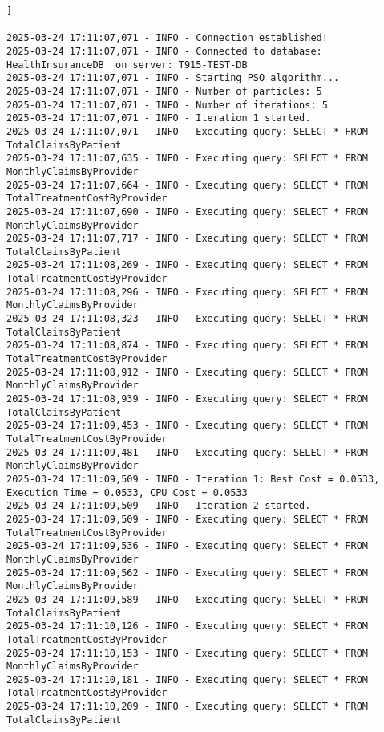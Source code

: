 

\begin{lstlisting}[style=pythonstyle, caption={Output from python code }, label={lst:pso_query_optimization}]]

2025-03-24 17:11:07,071 - INFO - Connection established!
2025-03-24 17:11:07,071 - INFO - Connected to database: HealthInsuranceDB  on server: T915-TEST-DB
2025-03-24 17:11:07,071 - INFO - Starting PSO algorithm...
2025-03-24 17:11:07,071 - INFO - Number of particles: 5
2025-03-24 17:11:07,071 - INFO - Number of iterations: 5
2025-03-24 17:11:07,071 - INFO - Iteration 1 started.
2025-03-24 17:11:07,071 - INFO - Executing query: SELECT * FROM TotalClaimsByPatient 
2025-03-24 17:11:07,635 - INFO - Executing query: SELECT * FROM MonthlyClaimsByProvider 
2025-03-24 17:11:07,664 - INFO - Executing query: SELECT * FROM TotalTreatmentCostByProvider 
2025-03-24 17:11:07,690 - INFO - Executing query: SELECT * FROM MonthlyClaimsByProvider 
2025-03-24 17:11:07,717 - INFO - Executing query: SELECT * FROM TotalClaimsByPatient 
2025-03-24 17:11:08,269 - INFO - Executing query: SELECT * FROM TotalTreatmentCostByProvider 
2025-03-24 17:11:08,296 - INFO - Executing query: SELECT * FROM MonthlyClaimsByProvider 
2025-03-24 17:11:08,323 - INFO - Executing query: SELECT * FROM TotalClaimsByPatient 
2025-03-24 17:11:08,874 - INFO - Executing query: SELECT * FROM TotalTreatmentCostByProvider 
2025-03-24 17:11:08,912 - INFO - Executing query: SELECT * FROM MonthlyClaimsByProvider 
2025-03-24 17:11:08,939 - INFO - Executing query: SELECT * FROM TotalClaimsByPatient 
2025-03-24 17:11:09,453 - INFO - Executing query: SELECT * FROM TotalTreatmentCostByProvider 
2025-03-24 17:11:09,481 - INFO - Executing query: SELECT * FROM MonthlyClaimsByProvider 
2025-03-24 17:11:09,509 - INFO - Iteration 1: Best Cost = 0.0533, Execution Time = 0.0533, CPU Cost = 0.0533
2025-03-24 17:11:09,509 - INFO - Iteration 2 started.
2025-03-24 17:11:09,509 - INFO - Executing query: SELECT * FROM TotalTreatmentCostByProvider 
2025-03-24 17:11:09,536 - INFO - Executing query: SELECT * FROM MonthlyClaimsByProvider 
2025-03-24 17:11:09,562 - INFO - Executing query: SELECT * FROM MonthlyClaimsByProvider 
2025-03-24 17:11:09,589 - INFO - Executing query: SELECT * FROM TotalClaimsByPatient 
2025-03-24 17:11:10,126 - INFO - Executing query: SELECT * FROM TotalTreatmentCostByProvider 
2025-03-24 17:11:10,153 - INFO - Executing query: SELECT * FROM MonthlyClaimsByProvider 
2025-03-24 17:11:10,181 - INFO - Executing query: SELECT * FROM TotalTreatmentCostByProvider 
2025-03-24 17:11:10,209 - INFO - Executing query: SELECT * FROM TotalClaimsByPatient 

\end{lstlisting}
